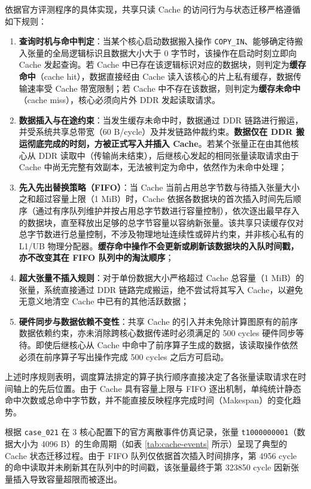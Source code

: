 \documentclass[anonymous,withtoc]{gmcm2026}
\providecommand{\tightlist}{\setlength{\itemsep}{0pt}\setlength{\parskip}{0pt}}
\begin{document}
依据官方评测程序的具体实现，共享只读 Cache 的访问行为与状态迁移严格遵循如下规则：

\begin{enumerate}
\def\labelenumi{\arabic{enumi}.}
\tightlist
\item
  \textbf{查询时机与命中判定}：当某个核心启动数据搬入操作 \texttt{COPY\_IN}、能够确定待搬入张量的全局逻辑标识且数据大小大于 0 字节时，该操作在启动时刻立即向 Cache 发起查询。若 Cache 中已存在该逻辑标识对应的数据块，则判定为\textbf{缓存命中}（cache hit），数据直接经由 Cache 读入该核心的片上私有缓存，数据传输速率受 Cache 带宽限制；若 Cache 中不存在该数据，则判定为\textbf{缓存未命中}（cache miss），核心必须向片外 DDR 发起读取请求。
\item
  \textbf{数据插入与在途约束}：当发生缓存未命中时，数据通过 DDR 链路进行搬运，并受系统共享总带宽（60 B/cycle）及并发链路仲裁约束。\textbf{数据仅在 DDR 搬运彻底完成的时刻，方被正式写入并插入 Cache}。若某个张量正在由其他核心从 DDR 读取中（传输尚未结束），后继核心发起的相同张量读取请求由于 Cache 中尚无完整有效副本，无法被判定为命中，依然作为未命中处理；
\item
  \textbf{先入先出替换策略（FIFO）}：当 Cache 当前占用总字节数与待插入张量大小之和超过容量上限（1 MiB）时，Cache 依据各数据块的首次插入时间先后顺序（通过有序队列维护并按占用总字节数进行容量控制），依次逐出最早存入的数据块，直至释放出足够的总字节容量以容纳新张量。该共享只读缓存仅对总字节数进行总量控制，不涉及物理地址连续性或碎片约束，并非核心私有的 L1/UB 物理分配器。\textbf{缓存命中操作不会更新或刷新该数据块的入队时间戳，亦不改变其在 FIFO 队列中的淘汰顺序}；
\item
  \textbf{超大张量不插入规则}：对于单份数据大小严格超过 Cache 总容量（1 MiB）的张量，系统直接通过 DDR 链路完成搬运，绝不尝试将其写入 Cache，以避免无意义地清空 Cache 中已有的其他活跃数据；
\item
  \textbf{硬件同步与数据依赖不变性}：共享 Cache 的引入并未免除计算图原有的前序数据依赖约束，亦未消除跨核心数据传递时必须满足的 500 cycles 硬件同步等待。即使后继核心从 Cache 中命中了前序算子生成的数据，该读取操作依然必须在前序算子写出操作完成 500 cycles 之后方可启动。
\end{enumerate}

上述时序规则表明，调度算法排定的算子执行顺序直接决定了各张量读取请求在时间轴上的先后位置。由于 Cache 具有容量上限与 FIFO 逐出机制，单纯统计静态命中次数或总命中字节数，并不能直接反映程序完成时间（Makespan）的变化趋势。

根据 \texttt{case\_021} 在 3 核心配置下的官方离散事件仿真记录，张量 \texttt{t1000000001}（数据大小为 4096 B）的生命周期（如表 \ref{tab:cache-events} 所示）呈现了典型的 Cache 状态迁移过程。由于 FIFO 队列仅依据首次插入时间排序，第 4956 cycle 的命中读取并未刷新其在队列中的时间戳，该张量最终于第 323850 cycle 因新张量插入导致容量超限而被逐出。
\end{document}
